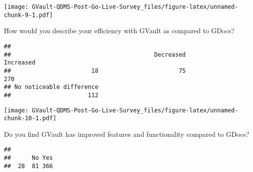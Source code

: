 \documentclass[
]{article}
\newenvironment{Shaded}{\begin{snugshade}}{\end{snugshade}}
\newcommand{\DataTypeTok}[1]{\textcolor[rgb]{0.13,0.29,0.53}{#1}}
\newcommand{\DecValTok}[1]{\textcolor[rgb]{0.00,0.00,0.81}{#1}}
\newcommand{\FloatTok}[1]{\textcolor[rgb]{0.00,0.00,0.81}{#1}}
\newcommand{\KeywordTok}[1]{\textcolor[rgb]{0.13,0.29,0.53}{\textbf{#1}}}
\newcommand{\NormalTok}[1]{#1}
\newcommand{\OperatorTok}[1]{\textcolor[rgb]{0.81,0.36,0.00}{\textbf{#1}}}
\newcommand{\StringTok}[1]{\textcolor[rgb]{0.31,0.60,0.02}{#1}}
\begin{document}
\texttt{[image: GVault-QDMS-Post-Go-Live-Survey\_files/figure-latex/unnamed-chunk-9-1.pdf]}

How would you describe your efficiency with GVault as compared to GDocs?

\begin{Shaded}
\end{Shaded}

\begin{verbatim}
## 
##                                         Decreased                Increased 
##                       18                       75                      270 
## No noticeable difference 
##                      112
\end{verbatim}

\begin{Shaded}
\end{Shaded}

\texttt{[image: GVault-QDMS-Post-Go-Live-Survey\_files/figure-latex/unnamed-chunk-10-1.pdf]}

Do you find GVault has improved features and functionality compared to
GDocs?

\begin{Shaded}
\end{Shaded}

\begin{verbatim}
## 
##      No Yes 
##  28  81 366
\end{verbatim}

\begin{Shaded}
\end{Shaded}
\end{document}
